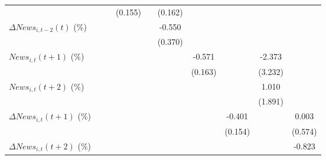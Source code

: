 {\begin{tabular}{l*{9}{c}}
                    &                     &                     &     (0.155)         &                     &     (0.162)         &                     &                     &                     &                     \\
\addlinespace
$ \Delta News_{i,t-2}(t)$ (\%)&                     &                     &                     &                     &      -0.550         &                     &                     &                     &                     \\
                    &                     &                     &                     &                     &     (0.370)         &                     &                     &                     &                     \\
\addlinespace
$ News_{i,t}(t+1)$ (\%)&                     &                     &                     &                     &                     &      -0.571\sym{***}&                     &      -2.373         &                     \\
                    &                     &                     &                     &                     &                     &     (0.163)         &                     &     (3.232)         &                     \\
\addlinespace
$ News_{i,t}(t+2)$ (\%)&                     &                     &                     &                     &                     &                     &                     &       1.010         &                     \\
                    &                     &                     &                     &                     &                     &                     &                     &     (1.891)         &                     \\
\addlinespace
$ \Delta News_{i,t}(t+1)$ (\%)&                     &                     &                     &                     &                     &                     &      -0.401\sym{***}&                     &       0.003         \\
                    &                     &                     &                     &                     &                     &                     &     (0.154)         &                     &     (0.574)         \\
\addlinespace
$ \Delta News_{i,t}(t+2)$ (\%)&                     &                     &                     &                     &                     &                     &                     &                     &      -0.823         \\

\end{tabular}}
